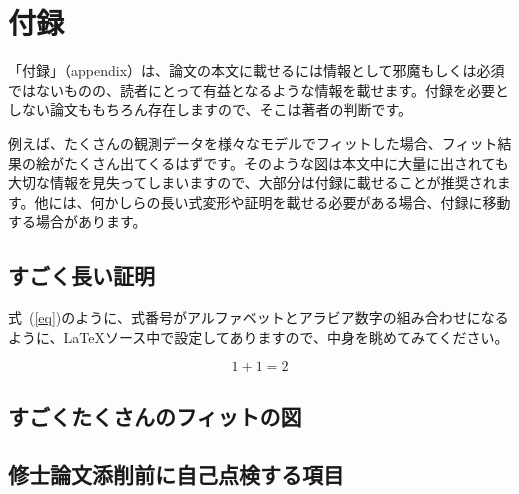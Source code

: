 \chapter*{付録} %

「付録」（appendix）は、論文の本文に載せるには情報として邪魔もしくは必須ではないものの、読者にとって有益となるような情報を載せます。付録を必要としない論文ももちろん存在しますので、そこは著者の判断です。

例えば、たくさんの観測データを様々なモデルでフィットした場合、フィット結果の絵がたくさん出てくるはずです。そのような図は本文中に大量に出されても大切な情報を見失ってしまいますので、大部分は付録に載せることが推奨されます。他には、何かしらの長い式変形や証明を載せる必要がある場合、付録に移動する場合があります。

\setcounter{section}{0} %
\renewcommand{\thesection}{\Alph{section}} %
\setcounter{equation}{0} %
\renewcommand{\theequation}{\Alph{section}.\arabic{equation}}
\setcounter{figure}{0} %
\renewcommand{\thefigure}{\Alph{section}.\arabic{figure}}
\setcounter{table}{0} %
\renewcommand{\thetable}{\Alph{section}.\arabic{table}}

\section{すごく長い証明}
式~(\ref{eq})のように、式番号がアルファベットとアラビア数字の組み合わせになるように、\LaTeX{}ソース中で設定してありますので、中身を眺めてみてください。

\begin{equation}
  \label{eq}
  1 + 1 = 2
\end{equation}


\section{すごくたくさんのフィットの図}

\section{修士論文添削前に自己点検する項目}

